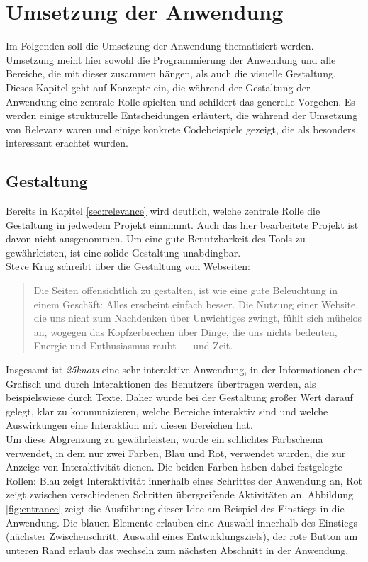 \chapter{Umsetzung der Anwendung}
\thispagestyle{fancy}
Im Folgenden soll die Umsetzung der Anwendung thematisiert werden. Umsetzung meint hier sowohl die Programmierung der Anwendung und alle Bereiche, die mit dieser zusammen hängen, als auch die visuelle Gestaltung. Dieses Kapitel geht auf Konzepte ein, die während der Gestaltung der Anwendung eine zentrale Rolle spielten und schildert das generelle Vorgehen. Es werden einige strukturelle Entscheidungen erläutert, die während der Umsetzung von Relevanz waren und einige konkrete Codebeispiele gezeigt, die als besonders interessant erachtet wurden.

\section{Gestaltung}
Bereits in Kapitel \ref{sec:relevance} wird deutlich, welche zentrale Rolle die Gestaltung in jedwedem Projekt einnimmt. Auch das hier bearbeitete Projekt ist davon nicht ausgenommen. Um eine gute Benutzbarkeit des Tools zu gewährleisten, ist eine solide Gestaltung unabdingbar.\\
Steve Krug schreibt über die Gestaltung von Webseiten:

\begin{quote}
  Die Seiten offensichtlich zu gestalten, ist wie eine gute Beleuchtung in einem Geschäft: Alles erscheint einfach besser. Die Nutzung einer Website, die uns nicht zum Nachdenken über Unwichtiges zwingt, fühlt sich mühelos an, wogegen das Kopfzerbrechen über Dinge, die uns nichts bedeuten, Energie und Enthusiasmus raubt — und Zeit. \cite[S. 19]{Krug201410}
\end{quote}

Insgesamt ist \textit{25knots} eine sehr interaktive Anwendung, in der Informationen eher Grafisch und durch Interaktionen des Benutzers übertragen werden, als beispielswiese durch Texte.
Daher wurde bei der Gestaltung großer Wert darauf gelegt, klar zu kommunizieren, welche Bereiche interaktiv sind und welche Auswirkungen eine Interaktion mit diesen Bereichen hat.\\
Um diese Abgrenzung zu gewährleisten, wurde ein schlichtes Farbschema verwendet, in dem nur zwei Farben, Blau und Rot, verwendet wurden, die zur Anzeige von Interaktivität dienen.
Die beiden Farben haben dabei festgelegte Rollen: Blau zeigt Interaktivität innerhalb eines Schrittes der Anwendung an, Rot zeigt zwischen verschiedenen Schritten übergreifende Aktivitäten an. Abbildung \ref{fig:entrance} zeigt die Ausführung dieser Idee am Beispiel des Einstiegs in die Anwendung. Die blauen Elemente erlauben eine Auswahl innerhalb des Einstiegs (nächster Zwischenschritt, Auswahl eines Entwicklungsziels), der rote Button am unteren Rand erlaub das wechseln zum nächsten Abschnitt in der Anwendung.

